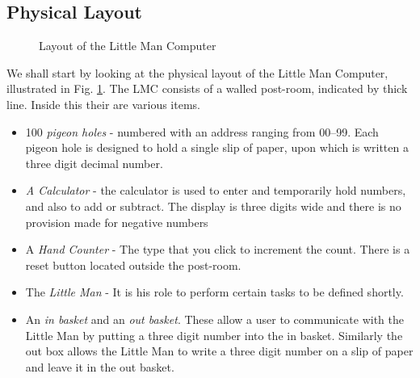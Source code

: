 			\subsection{Physical Layout}
				\begin{figure}[t]
					\begin{center}
					\end{center}
					\caption{\label{fig:LMCLayout} Layout of the Little Man Computer}
				\end{figure}
				We shall start by looking at the physical layout of the Little Man Computer, illustrated in Fig. \ref{fig:LMCLayout}. The LMC consists of a walled post-room, indicated by thick line. Inside this their are various items.
				\begin{itemize}
					\item \num{100} \textit{pigeon holes} - numbered with an address ranging from \numrange[minimum-integer-digits=2]{00}{99}. Each pigeon hole is designed to hold a single slip of paper, upon which is written a three digit decimal number. 
					\item  \textit{A Calculator} - the calculator is used to enter and temporarily hold numbers, and also to add or subtract. The display is three digits wide and there is no provision made for negative numbers
					\item A \textit{Hand Counter} - The type that you click to increment the count. There is a reset button located outside the post-room.
					\item The \textit{Little Man} - It is his role to perform certain tasks to be defined shortly.
					\item An \textit{in basket} and an \textit{out basket}. These allow a user to communicate with the Little Man by putting a three digit number into the in basket. Similarly the out box allows the Little Man to write a three digit number on a slip of paper and leave it in the out basket.
				\end{itemize} 
				
